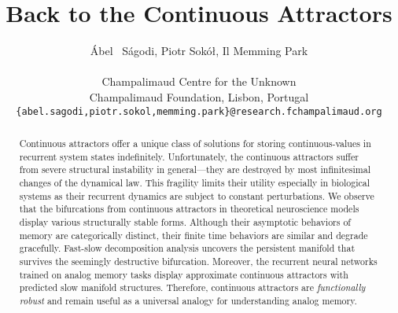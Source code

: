\documentclass{article} %
\title{Back to the Continuous Attractors}
\author{%
    \'Abel ~S\'agodi, Piotr Sok\'o\l, Il Memming Park \\
    \\
    Champalimaud Centre for the Unknown\\
    Champalimaud Foundation, Lisbon, Portugal\\
    \texttt{\{abel.sagodi,piotr.sokol,memming.park\}@research.fchampalimaud.org} \\
}
\newcounter{ct}
\theoremstyle{definition}
\theoremstyle{remark}
\begin{document}
    

\maketitle

\begin{abstract}
Continuous attractors offer a unique class of solutions for storing continuous-values in recurrent system states indefinitely.
Unfortunately, the continuous attractors suffer from severe structural instability in general---they are destroyed by most infinitesimal changes of the dynamical law.
This fragility limits their utility especially in biological systems as their recurrent dynamics are subject to constant perturbations.
We observe that the bifurcations from continuous attractors in theoretical neuroscience models display various structurally stable forms.
Although their asymptotic behaviors of memory are categorically distinct, their finite time behaviors are similar and degrade gracefully.
Fast-slow decomposition analysis uncovers the persistent manifold that survives the seemingly destructive bifurcation.
Moreover, the recurrent neural networks trained on analog memory tasks display approximate continuous attractors with predicted slow manifold structures.
Therefore, continuous attractors are \emph{functionally robust} and remain useful as a universal analogy for understanding analog memory.
\end{abstract}
\end{document}
